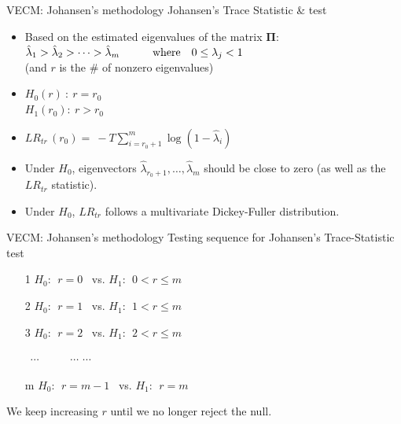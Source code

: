 \documentclass[usenames,dvipsnames]{beamer}
\begin{document}
\begin{frame}{VECM: Johansen’s methodology}
Johansen's Trace Statistic \& test\\
\bigskip
\begin{itemize}
    \item Based on the estimated eigenvalues of the matrix $\bm{\Pi}$:\\
    $\hat{\lambda}_1 > \hat{\lambda}_2 > \dots > \hat{\lambda}_m \qquad \textnormal{~~~where~~~}0 \leq \lambda_j < 1$\\
    (and $r$ is the \# of nonzero eigenvalues)
    \medskip
    \item $H_0(r)~:~r=r_0$ \\$H_1(r_0):~r > r_0$
    \medskip
    \item $\textit{LR}_{\textit{tr}}\, (r_0) =~ - T \! \displaystyle \sum_{i=r_0+1}^m \log(1-\hat{\lambda}_i) $\\
    \medskip
    \item Under $H_0$, eigenvectors $\hat{\lambda}_{r_0+1}, \dots, \hat{\lambda}_{m}$ should be close to zero (as well as the $\textit{LR}_{\textit{tr}}$ statistic). \\
    \medskip
    \item Under $H_0$, $\textit{LR}_{\textit{tr}}$ follows a multivariate Dickey-Fuller distribution.
\end{itemize}
\end{frame}
\begin{frame}{VECM: Johansen’s methodology}
Testing sequence for Johansen's Trace-Statistic test\\
\bigskip
\begin{enumerate}
    \item[1] $H_0:~~r=0$ \qquad \qquad ~vs. \qquad $H_1:~~0 < r \leq m$
    \item[2] $H_0:~~r=1$ \qquad \qquad  ~vs. \qquad $H_1:~~1 < r \leq m$
    \item[3] $H_0:~~r=2$ \qquad  \qquad ~vs. \qquad $H_1:~~2 < r \leq m$
    \item[] ~$\cdots$ \qquad \qquad \qquad ~~~~~$\cdots$ \qquad \qquad $\cdots$
    \item[m] $H_0:~~r=m-1$ \qquad ~vs. \qquad $H_1:~~r = m$
\end{enumerate}
\bigskip
We keep increasing $r$ until we no longer reject the null.
\end{frame}
\end{document}

